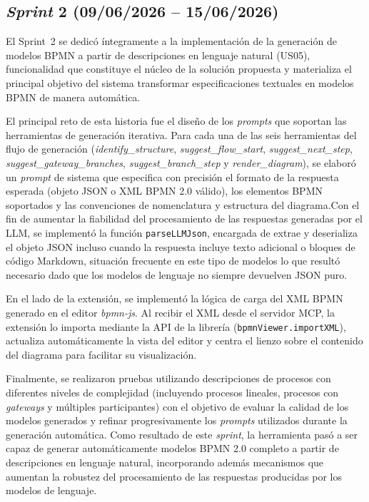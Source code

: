 
\subsection{\textit{Sprint} 2 (09/06/2026 -- 15/06/2026)}
\label{subsec:sprint2}

El Sprint~2 se dedicó íntegramente a la implementación de la generación de modelos BPMN a partir de descripciones en lenguaje natural (US05), funcionalidad que constituye el núcleo de la solución propuesta y materializa el principal objetivo del sistema transformar especificaciones textuales en modelos BPMN de manera automática.

El principal reto de esta historia fue el diseño de los \textit{prompts} que soportan las herramientas de generación iterativa. Para cada una de las seis herramientas del flujo de generación (\textit{identify\_structure}, \textit{suggest\_flow\_start}, \textit{suggest\_next\_step}, \textit{suggest\_gateway\_branches}, \textit{suggest\_branch\_step} y \textit{render\_diagram}), se elaboró un \textit{prompt} de sistema que especifica con precisión el formato de la respuesta esperada (objeto JSON o XML BPMN 2.0 válido), los elementos BPMN soportados y las convenciones de nomenclatura y estructura del diagrama.Con el fin de aumentar la fiabilidad del procesamiento de las respuestas generadas por el LLM, se implementó la función \texttt{parseLLMJson}, encargada de extrae y deserializa el objeto JSON incluso cuando la respuesta incluye texto adicional o bloques de código Markdown, situación frecuente en este tipo de modelos lo que resultó necesario dado que los modelos de lenguaje no siempre devuelven JSON puro.

En el lado de la extensión, se implementó la lógica de carga del XML BPMN generado en el editor \textit{bpmn-js}. Al recibir el XML desde el servidor MCP, la extensión lo importa mediante la API de la librería (\texttt{bpmnViewer.importXML}), actualiza automáticamente la vista del editor y centra el lienzo sobre el contenido del diagrama para facilitar su visualización.

Finalmente, se realizaron pruebas utilizando descripciones de procesos con diferentes niveles de complejidad (incluyendo procesos lineales, procesos con \textit{gateways} y múltiples participantes) con el objetivo de evaluar la calidad de los modelos generados y refinar progresivamente los \textit{prompts} utilizados durante la generación automática. 
Como resultado de este \textit{sprint}, la herramienta pasó a ser capaz de generar automáticamente modelos BPMN 2.0 completo a partir de descripciones en lenguaje natural, incorporando además mecanismos que aumentan la robustez del procesamiento de las respuestas producidas por los modelos de lenguaje.


